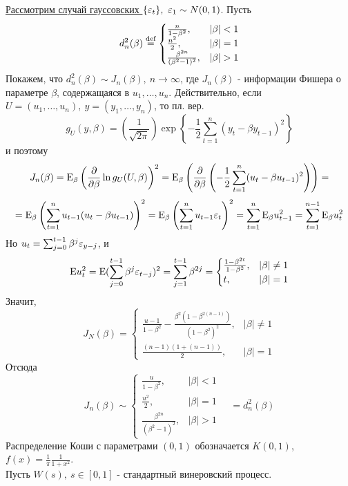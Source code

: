 \underline{Рассмотрим случай гауссовских $\{\varepsilon_t\},\ \varepsilon_1\sim N(0,1)$}. Пусть
\[d_n^2(\beta)\stackrel{\text{def}}{=}\begin{cases}
    \frac{n}{1-\beta^2},& \left\lvert \beta\right\rvert <1 \\
    \frac{n^2}{2},& \left\lvert \beta\right\rvert =1 \\
    \frac{\beta^{2n}}{(\beta^2-1)^2},& \left\lvert \beta\right\rvert >1
\end{cases}\]
Покажем, что $d_n^2(\beta)\sim J_n(\beta),\ n\rightarrow\infty$,
где $J_n(\beta)$ - информации Фишера о параметре $\beta$,
содержащаяся в $u_1,\ldots,u_n$. Действительно,
если $U=(u_1,\ldots,u_n),\ y=(y_1,\ldots,y_n)$, то пл. вер.
\[g_U(y,\beta)=\left(\frac{1}{\sqrt{2\pi}}\right)\exp{\left\{-\frac{1}{2}\sum_{t=1}^n(y_t-\beta y_{t-1})^2\right\}}\]
и поэтому
\[J_n(\beta)=\mathrm{E}_{\beta}\left(\frac{\partial}{\partial\beta}\ln g_U(U,\beta)\right)^2=\mathrm{E}_\beta\left(\frac{\partial}{\partial\beta}\left(-\frac{1}{2}\sum_{t=1}^n(u_t-\beta u_{t-1})^2\right)\right)=\]
\[=\mathrm{E}_\beta\left(\sum_{t=1}^nu_{t-1}(u_t-\beta u_{t-1})\right)^2=\mathrm{E}_\beta\left(\sum_{t=1}^nu_{t-1}\varepsilon_t\right)^2=\sum_{t=1}^n\mathrm{E}_\beta u^2_{t-1}=\sum_{t=1}^{n-1}\mathrm{E}_\beta u^2_{t}\]
Но $u_t=\sum_{j=0}^{t-1}\beta^j\varepsilon_{y-j}$, и
\[\mathrm{E} u_t^2=\mathrm{E}(\sum_{j=0}^{t-1}\beta^j\varepsilon_{t-j})^2=\sum_{j=1}^{t-1}\beta^{2j}=\begin{cases}
    \frac{1-\beta^{2t}}{1-\beta^2},& \left\lvert \beta\right\rvert \neq1 \\
    t,& \left\lvert \beta\right\rvert =1
\end{cases}\]
Значит,
\[J_N(\beta)=\begin{cases}
    \frac{u-1}{1-\beta^2}-\frac{\beta^2(1-\beta^{2(n-1)})}{(1-\beta^2)^2},& \left\lvert \beta\right\rvert \neq1\\
    \frac{(n-1)(1+(n-1))}{2},& \left\lvert \beta\right\rvert  =1
\end{cases}\]
Отсюда
\[
    J_n(\beta)\sim\begin{cases}
        \frac{u}{1-\beta^2},& \left\lvert \beta\right\rvert <1 \\
        \frac{u^2}{2},& \left\lvert \beta\right\rvert =1 \\
        \frac{\beta^{2n}}{(\beta^2-1)^2},& \left\lvert \beta\right\rvert >1
    \end{cases}
    \quad =d^2_n(\beta)
\]
Распределение Коши с параметрами $(0,1)$ обозначается $K(0,1)$, $f(x)=\frac{1}{\pi}\frac{1}{1+x^2}$. \\
Пусть $W(s),\ s\in[0,1]$ - стандартный винеровский процесс.
